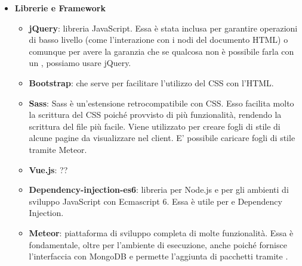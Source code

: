 \begin{itemize}
\begin{itemize}
	\end{itemize}
	\item \textbf{Librerie e Framework}
	\begin{itemize}
	\item \textbf{jQuery}: libreria JavaScript. Essa è stata inclusa per garantire operazioni di basso livello (come l'interazione con i nodi del documento HTML) o comunque per avere la garanzia che se qualcosa non è possibile farla con un , possiamo usare jQuery.
	\item \textbf{Bootstrap}:  che serve per facilitare l'utilizzo del CSS con l'HTML.
	\item \textbf{Sass}: Sass è un'estensione retrocompatibile con CSS. Esso facilita molto la scrittura del CSS poiché provvisto di più funzionalità, rendendo la scrittura del file più facile. Viene utilizzato per creare fogli di stile di alcune pagine da visualizzare nel client. E' possibile caricare fogli di stile tramite Meteor.
	\item \textbf{Vue.js}: ??
	\item \textbf{Dependency-injection-es6}: libreria per Node.js e per gli ambienti di sviluppo JavaScript con Ecmascript 6. Essa è utile per  e {Dependency Injection}.
	\item \textbf{Meteor}: piattaforma di sviluppo completa di molte funzionalità. Essa è fondamentale, oltre per l'ambiente di esecuzione, anche poiché fornisce l'interfaccia con MongoDB e permette l'aggiunta di pacchetti tramite .
	\end{itemize}
\end{itemize}

